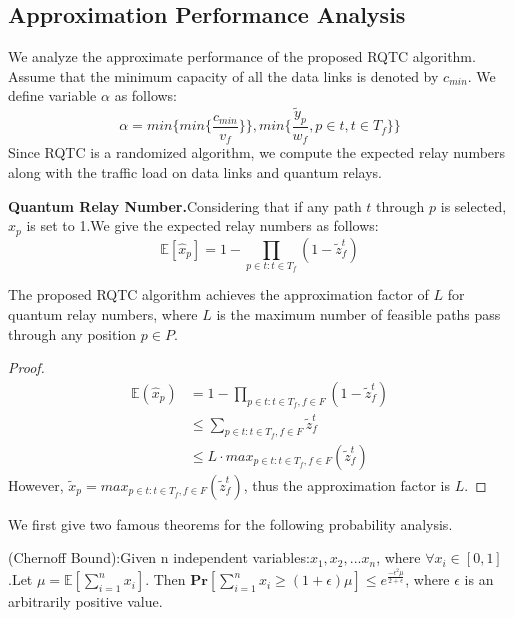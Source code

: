 \subsection{Approximation Performance Analysis}
We analyze the approximate performance of the proposed RQTC algorithm. Assume that the minimum capacity of all the data links is denoted by $c_{min}$. We define variable $\alpha$ as follows:
\begin{equation}\label{alpha}
  \alpha = min\{min\{\frac{c_{min}}{v_f}\}\},min\{\frac{\widetilde{y}_p}{w_f},p \in t,t \in T_f\}\}
\end{equation}
Since RQTC is a randomized algorithm, we compute the expected relay numbers along with the traffic load on data links and quantum relays.


\textbf{Quantum Relay Number.}Considering that if any path $t$ through $p$ is selected, $\hat{x}_p$ is set to 1.We give the expected relay numbers as follows:
\begin{equation}
\mathbb{E}[\hat{x}_p] = 1 - \prod_{p \in t: t \in T_f}{(1-\widetilde{z}_f^t)}
\end{equation}
\begin{theorem}
  The proposed RQTC algorithm achieves the approximation factor of $L$ for quantum relay numbers, where $L$ is the maximum number of feasible paths pass through any position $p \in P$.
  \begin{proof}
  \begin{equation}
  \begin{aligned}
    \mathbb{E}(\hat{x}_p) &= 1 - \prod_{p \in t: t \in T_f,f \in F}{(1-\widetilde{z}_f^t)} \\
    &\le \sum_{p \in t: t \in T_f,f \in F}\widetilde{z}_f^t \\
    &\le L \cdot max_{p \in t: t \in T_f,f \in F}(\widetilde{z}_f^t)
    \end{aligned}
  \end{equation}
  However, $\widetilde{x}_p = max_{p \in t: t \in T_f,f \in F}(\widetilde{z}_f^t)$, thus the approximation factor is $L$.
  \end{proof}
\end{theorem}

We first give two famous theorems for the following probability analysis.
\begin{lemma}\label{chernoff}
(Chernoff Bound):Given n independent variables:$x_1,x_2,...x_n$, where $\forall x_i \in [0,1]$.Let $\mu = \mathbb{E}[\sum_{i=1}^{n}x_i]$. Then $\textbf{Pr}[\sum_{i=1}^{n}x_i \ge (1+\epsilon)\mu] \le e^{\frac{-\epsilon^2\mu}{2+\epsilon}}$, where $\epsilon$ is an arbitrarily positive value.
\end{lemma}

